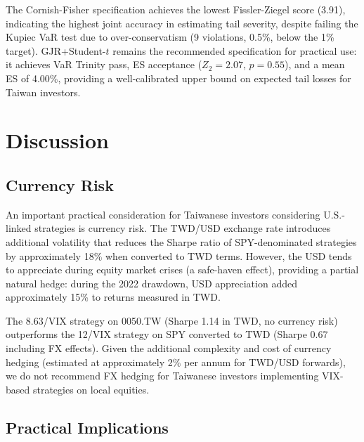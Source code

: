 The Cornish-Fisher specification achieves the lowest Fissler-Ziegel score (3.91), indicating the highest joint accuracy in estimating tail severity, despite failing the Kupiec VaR test due to over-conservatism (9 violations, 0.5\%, below the 1\% target).%
GJR+Student-$t$ remains the recommended specification for practical use: it achieves VaR Trinity pass, ES acceptance ($Z_2 = 2.07$, $p = 0.55$), and a mean ES of 4.00\%, providing a well-calibrated upper bound on expected tail losses for Taiwan investors.%



\section{Discussion}
\label{sec:discussion}

\subsection{Currency Risk}

An important practical consideration for Taiwanese investors considering U.S.-linked strategies is currency risk. The TWD/USD exchange rate introduces additional volatility that reduces the Sharpe ratio of SPY-denominated strategies by approximately 18\% when converted to TWD terms. However, the USD tends to appreciate during equity market crises (a safe-haven effect), providing a partial natural hedge: during the 2022 drawdown, USD appreciation added approximately 15\% to returns measured in TWD.

The 8.63/VIX strategy on 0050.TW (Sharpe 1.14 in TWD, no currency risk) outperforms the 12/VIX strategy on SPY converted to TWD (Sharpe 0.67 including FX effects). Given the additional complexity and cost of currency hedging (estimated at approximately 2\% per annum for TWD/USD forwards), we do not recommend FX hedging for Taiwanese investors implementing VIX-based strategies on local equities.

\subsection{Practical Implications}

